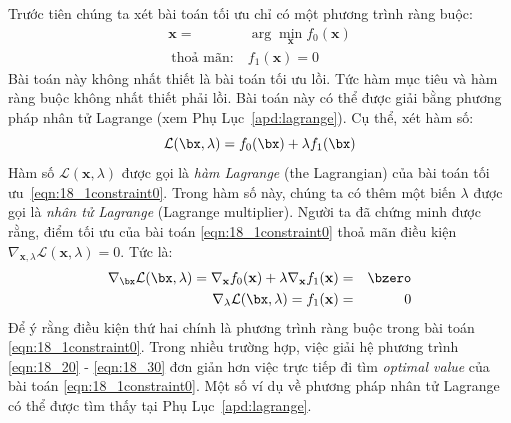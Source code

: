 Trước tiên chúng ta xét bài toán tối ưu chỉ có một phương trình ràng buộc: 
\begin{equation} 
    \label{eqn:18_1constraint0}
    \begin{aligned}
    \mathbf{x}=& \arg\min_{\mathbf{x}} f_0(\mathbf{x}) \\\ 
    \text{thoả mãn:}~& f_1(\mathbf{x}) = 0
    \end{aligned}
\end{equation} 
Bài toán này không nhất thiết là bài toán tối ưu lồi. Tức hàm mục tiêu
và hàm ràng buộc không nhất thiết phải lồi. Bài toán này có thể được giải bằng
phương pháp nhân tử Lagrange (xem Phụ Lục~\ref{apd:lagrange}). Cụ thể, xét hàm
số:
\begin{equation}
    \label{eqn:simple_lagrange}
    \mathcal{L}(\bx, \lambda) = f_0(\bx) + \lambda f_1(\bx)
\end{equation}
 Hàm số
$\mathcal{L}(\mathbf{x}, \lambda)$ được gọi là \textit{hàm Lagrange}
(the Lagrangian) của bài toán tối ưu~\eqref{eqn:18_1constraint0}. Trong
hàm số này, chúng ta có thêm một biến  $\lambda$ được gọi là
\textit{nhân tử Lagrange} ({Lagrange multiplier}). Người ta đã chứng
minh được rằng, điểm tối ưu của bài toán
\eqref{eqn:18_1constraint0} thoả mãn điều kiện $\nabla_{\mathbf{x}, \lambda}
\mathcal{L}(\mathbf{x}, \lambda) = 0$. Tức là:
\begin{eqnarray} 
\label{eqn:18_20}
    \nabla_{\bx} \mathcal{L}(\bx, \lambda) = \nabla_{\mathbf{x}}f_0(\mathbf{x}) + \lambda \nabla_{\mathbf{x}} f_1(\mathbf{x}) &=& \bzero \\\ 
    \label{eqn:18_30}
    \nabla_{\lambda} \mathcal{L}(\bx, \lambda) = f_1(\mathbf{x}) & = & 0 
\end{eqnarray} 
Để ý rằng điều kiện thứ hai chính là phương trình ràng buộc trong bài toán
\eqref{eqn:18_1constraint0}.
Trong nhiều
trường hợp, việc giải hệ phương trình \eqref{eqn:18_20} - \eqref{eqn:18_30} đơn giản hơn việc trực tiếp đi tìm \textit{optimal value} của bài
toán \eqref{eqn:18_1constraint0}. Một số ví dụ về phương pháp nhân tử Lagrange
có thể được tìm thấy tại Phụ Lục~\ref{apd:lagrange}. 
 
 
